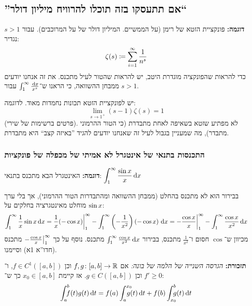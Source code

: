 \documentclass[name=רשימות חדו''א 2א]{../../../tex/classes/noChapterMegasumPreamble}
\newcommand\Is{\dequad \ }
\begin{document}
	\subsection*{''אם תתעסקו בזה תוכלו להרוויח מיליון דולר``}
	\textbf{דוגמה: }פונקציית הזטא של רימן (על הממשיים. המיליון דולר של על המרוכבים). עבור $s > 1$ נגדיר:
	\[ \zeta(s) \coloneqq \sum_{i = 1}^{\infty}\frac{1}{n^{s}} \]
	כדי להראות שהפונקציה מוגדרת היטב, יש להראות שהטור לעיל מתכנס. את זה אנחנו יודעים ממבחן ההשוואה, כי הראנו ש־$\int^{\infty}_1 \frac{\,\mathrm{d}x}{x^{s}}$ עבור $s > 1$.

	יש לפונקציית הזטא תכונות נחמדות מאוד. לדוגמה:
	\[ \lim_{s \to 1^{+}}(s-1)\zeta(s) = 1 \]
	(פרטים ברשימות של שירי). לא מפתיע שזטא בשאיפה לאחת מתבדרת (כי הטור ההרמוני מתבדר), מה שמעניין בגבול לעיל זה שאנחנו יודעים להגיד ''באיזה קצב`` היא מתבדרת.
\subsubsection{התכנסות בתנאי של אינטגרל לא אמיתי של מכפלה של פונקציות}
	\textbf{דוגמה: }האינטגרל הבא מתכנס בתנאי: \hfill $\displaystyle \int^{\infty}_1 \frac{\sin x}{x}\,\mathrm{d}x$

	בבירור הוא לא מתכנס בהחלט (ממבחן ההשוואה ומהתבדרות הטור ההרמוני), אך בלי ערך מוחלט מאינטגרציה בחלקים על $\sin x$:
	\[ \int^{\infty}_1\frac{1}{x}\sin x \,\mathrm{d}x = \frac{1}{x}(-\cos x)\bigg\vert^{\infty}_1 - \int^{\infty}_1\left ( -\frac{1}{x^{2}} \right )\left ( -\cos x \right )\,\mathrm{d}x = -\frac{\cos x}{x}\bigg\vert^{\infty}_1 - \int^{\infty}_1\frac{\cos x}{x^{2}}\,\mathrm{d}x \]
	מכיוון ש־$\cos$ חסום ו־$\frac{1}{x^{2}}$ מתכנס, בבירור $\int^{\infty}_1\frac{\cos x}{x^{2}}\,\mathrm{d}x$ מתכנס. נוסף על כך $-\frac{\cos x}{x}\big\vert^{\infty}_1$ מתכנס (חדו''א 1א) וסיימנו.


	\textbf{תזכורת: }\textit{הגרסה השנייה של הלמה של בונה: }אם $f, g \colon [a, b] \to \mathbb{R}$ וכן $f \in C^{1}([a, b])$, ו־$f' \ge 0$ וכן $g \in C([a, b])$. אז קיימת $x_0 \in [a, b]$ כך ש־:
	\[ \int^{b}_a \Is f(t)g(t)\dt = f(a)\int^{x_0}_a \dequad g(t)\dt + f(b)\int^{b}_{x_0} \Is g(t)\dt \]
\end{document}
